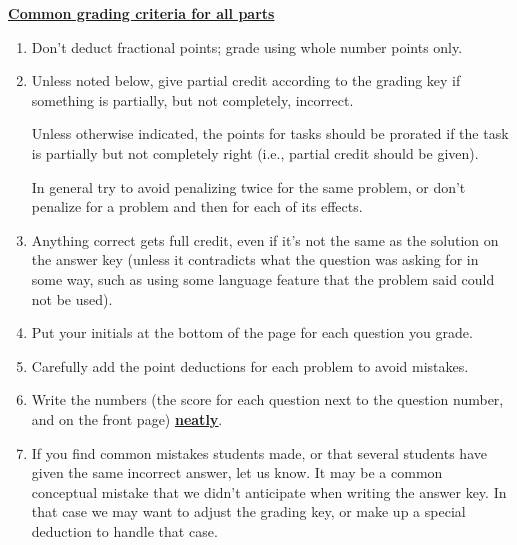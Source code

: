 \documentclass[11pt,fleqn]{article}
\begin{document}
{\begin{info}{\textbf{\underline{\Large Common grading criteria for all
                 parts}}}
\begin{enumerate}
        \item Don't deduct fractional points; grade using whole number points
              only.

        \item Unless noted below, give partial credit according to the
              grading key if something is partially, but not completely,
              incorrect.

              Unless otherwise indicated, the points for tasks should be
              prorated if the task is partially but not completely right
              (i.e., partial credit should be given).

              In general try to avoid penalizing twice for the same problem,
              or don't penalize for a problem and then for each of its
              effects.


        \item Anything correct gets full credit, even if it's not the same as
              the solution on the answer key (unless it contradicts what the
              question was asking for in some way, such as using some language
              feature that the problem said could not be used).

        \item Put your initials at the bottom of the page for each question you
              grade.

        \item Carefully add the point deductions for each problem to avoid
              mistakes.

        \item Write the numbers (the score for each question next to the
              question number, and on the front page)
              \textbf{\underline{\underline{neatly}}}.

        \item If you find common mistakes students made, or that several
              students have given the same incorrect answer, let us know.  It
              may be a common conceptual mistake that we didn't anticipate
              when writing the answer key.  In that case we may want to adjust
              the grading key, or make up a special deduction to handle that
              case.


\end{enumerate}
\end{info}}
\end{document}
